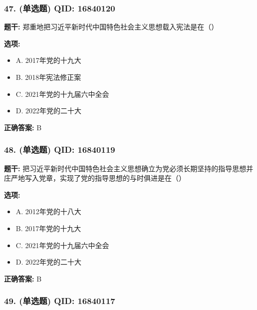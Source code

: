 \documentclass[12pt,UTF8]{ctexart}
\begin{document}
\subsubsection*{47. (单选题) \small QID: 16840120}

\textbf{题干:}
郑重地把习近平新时代中国特色社会主义思想载入宪法是在（）

\textbf{选项:}
\begin{itemize}[leftmargin=*]

  \item A. 2017年党的十九大

  \item B. 2018年宪法修正案

  \item C. 2021年党的十九届六中全会

  \item D. 2022年党的二十大

\end{itemize}

\textbf{正确答案:}
B

\vspace{0.3em}\hrulefill\vspace{0.7em}

\subsubsection*{48. (单选题) \small QID: 16840119}

\textbf{题干:}
把习近平新时代中国特色社会主义思想确立为党必须长期坚持的指导思想并庄严地写入党章，实现了党的指导思想的与时俱进是在（）

\textbf{选项:}
\begin{itemize}[leftmargin=*]

  \item A. 2012年党的十八大

  \item B. 2017年党的十九大

  \item C. 2021年党的十九届六中全会

  \item D. 2022年党的二十大

\end{itemize}

\textbf{正确答案:}
B

\vspace{0.3em}\hrulefill\vspace{0.7em}

\subsubsection*{49. (单选题) \small QID: 16840117}
\end{document}
